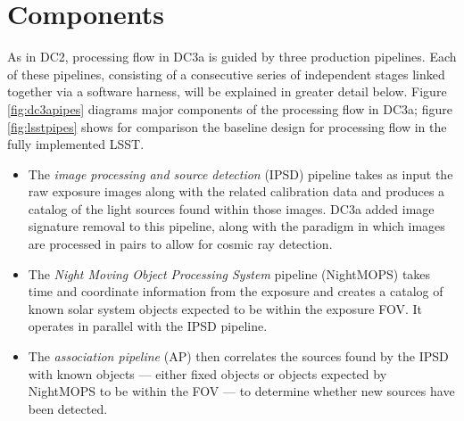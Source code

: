 
\section{Components}

As in DC2, processing flow in DC3a is guided by three production pipelines. Each of
these pipelines, consisting of a consecutive series of independent stages
linked together via a software harness, will be explained in greater detail below. 
Figure \ref{fig:dc3apipes} diagrams major components of the processing flow in DC3a;
figure \ref{fig:lsstpipes} shows for comparison the baseline design for processing 
flow in the fully implemented LSST.

\begin{itemize}

\item The \textit{image processing and source detection} (IPSD) pipeline takes 
as input the raw exposure images along with the related calibration data and 
produces a catalog of the light sources found within those images. DC3a added
image signature removal to this pipeline, along with the paradigm in which
images are processed in pairs to allow for cosmic ray detection.

\item The \textit{Night Moving Object Processing System} pipeline (NightMOPS) takes
time and coordinate information from the exposure and creates
a catalog of known solar system objects expected to be within
the exposure FOV. It operates in parallel with the IPSD pipeline.

\item The \textit{association pipeline} (AP) then correlates the sources found
by the IPSD with known objects --- either fixed objects or objects expected
by NightMOPS to be within the FOV --- to determine whether new sources
have been detected.


\end{itemize}

